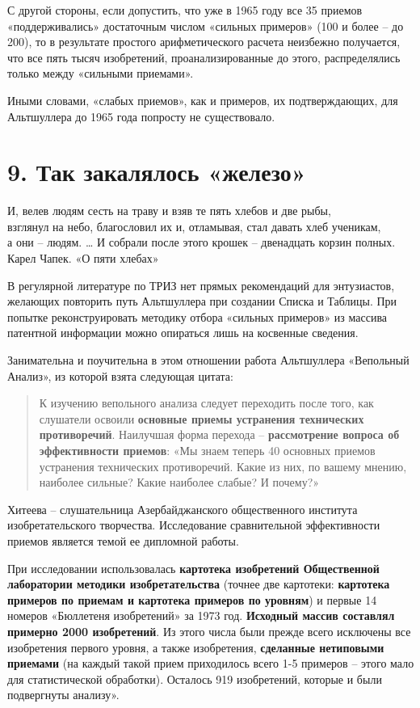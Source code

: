 \documentclass[11pt,a4paper]{article}
\begin{document}
С другой стороны, если допустить, что уже в 1965 году все 35 приемов
«поддерживались» достаточным числом «сильных примеров» (100 и более -- до
200), то в результате простого арифметического расчета неизбежно получается,
что все пять тысяч изобретений, проанализированные до этого, распределялись
только между «сильными приемами».

Иными словами, «слабых приемов», как и примеров, их подтверждающих, для
Альтшуллера до 1965 года попросту не существовало.
\clearpage

\section*{9. Так закалялось «железо»}
\begin{flushright}
  
  И, велев людям сесть на траву и взяв те пять хлебов и две рыбы,\\ взглянул
  на небо, благословил их и, отламывая, стал давать хлеб ученикам,\\ а они --
  людям. …  И собрали после этого крошек -- двенадцать корзин полных.\\[4pt]
  Карел Чапек. «О пяти хлебах»
\end{flushright}
В регулярной литературе по ТРИЗ нет прямых рекомендаций для энтузиастов,
желающих повторить путь Альтшуллера при создании Списка и Таблицы. При попытке
реконструировать методику отбора «сильных примеров» из массива патентной
информации можно опираться лишь на косвенные сведения.

Занимательна и поучительна в этом отношении работа Альтшуллера «Вепольный
Анализ», из которой взята следующая цитата:
\begin{quote}
  К изучению вепольного анализа следует переходить после того, как слушатели
  освоили \textbf{основные приемы устранения технических противоречий}.
  Наилучшая форма перехода -- \textbf{рассмотрение вопроса об эффективности
    приемов}: «Мы знаем теперь 40 основных приемов устранения технических
  противоречий. Какие из них, по вашему мнению, наиболее сильные? Какие
  наиболее слабые? И почему?»
\end{quote}
Хитеева -- слушательница Азербайджанского общественного института
изобретательского творчества. Исследование сравнительной эффективности приемов
является темой ее дипломной работы.

При исследовании использовалась \textbf{картотека изобретений Общественной
  лаборатории методики изобретательства} (точнее две картотеки:
\textbf{картотека примеров по приемам и картотека примеров по уровням}) и
первые 14 номеров «Бюллетеня изобретений» за 1973 год. \textbf{Исходный массив
  составлял примерно 2000 изобретений}. Из этого числа были прежде всего
исключены все изобретения первого уровня, а также изобретения,
\textbf{сделанные нетиповыми приемами} (на каждый такой прием приходилось
всего 1-5 примеров -- этого мало для статистической обработки). Осталось 919
изобретений, которые и были подвергнуты анализу».  \cite{Altshuller1973b} 
\end{document}
